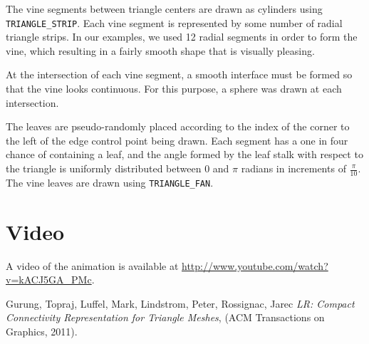 \documentclass[letterpaper,10pt]{IEEEtran}
\begin{document}
The vine segments between triangle centers are drawn as cylinders using  \verb+TRIANGLE_STRIP+.
Each vine segment is represented by some number of radial triangle strips.
In our examples, we used 12 radial segments in order to form the vine, which resulting in a fairly smooth shape that is visually pleasing.

At the intersection of each vine segment, a smooth interface must be formed so that the vine looks continuous.
For this purpose, a sphere was drawn at each intersection.

The leaves are pseudo-randomly placed according to the index of the corner to the left of the edge control point being drawn.
Each segment has a one in four chance of containing a leaf, and the angle formed by the leaf stalk with respect to the triangle is uniformly distributed between 0 and $\pi$ radians in increments of $\frac{\pi}{10}$.
The vine leaves are drawn using \verb+TRIANGLE_FAN+.

\section{Video}
A video of the animation is available at \href{http://www.youtube.com/watch?v=kACJ5GA_PMc}{http://www.youtube.com/watch?v=kACJ5GA\_PMc}.

\begin{thebibliography}{9}
 Gurung, Topraj, Luffel, Mark, Lindstrom, Peter,  Rossignac, Jarec \textit{LR: Compact Connectivity Representation for Triangle Meshes}, (ACM Transactions on Graphics, 2011).
\end{thebibliography}
\end{document}
